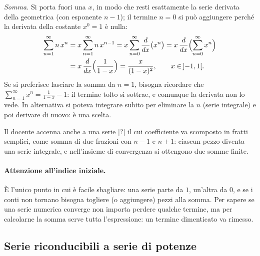 \emph{Somma.}
Si porta fuori una $x$, in modo che resti esattamente la serie derivata della geometrica (con esponente $n-1$);
il termine $n=0$ si può aggiungere perché la derivata della costante $x^0=1$ è nulla:
\begin{align*}
  \sum_{n=1}^{\infty} n\, x^n
  &= x \sum_{n=1}^{\infty} n\, x^{n-1}
  = x \sum_{n=0}^{\infty} \frac{d}{dx}\bigl(x^n\bigr)
  = x\, \frac{d}{dx} \Bigl( \sum_{n=0}^{\infty} x^n \Bigr) \\
  &= x\, \frac{d}{dx} \Bigl( \frac{1}{1-x} \Bigr)
  = \frac{x}{(1-x)^2} ,
  \qquad x\in\,]{-1},1[ .
\end{align*}
Se si preferisce lasciare la somma da $n=1$, bisogna ricordare che $\sum_{n=1}^{\infty} x^n = \frac{1}{1-x}-1$:
il termine tolto si sottrae, e comunque la derivata non lo vede. In alternativa si poteva integrare subito per
eliminare la $n$ (serie integrale) e poi derivare di nuovo: è una scelta.

Il docente accenna anche a una serie [?] il cui coefficiente va scomposto in fratti semplici, come somma di due
frazioni con $n-1$ e $n+1$: ciascun pezzo diventa una serie integrale, e nell'insieme di convergenza si ottengono
due somme finite.

\paragraph{Attenzione all'indice iniziale.}
È l'unico punto in cui è facile sbagliare: una serie parte da $1$, un'altra da $0$, e se i conti non tornano
bisogna togliere (o aggiungere) pezzi alla somma.
Per sapere se una serie numerica converge non importa perdere qualche termine, ma per calcolarne la somma serve
tutta l'espressione: un termine dimenticato va rimesso.

\subsection{Serie riconducibili a serie di potenze}

